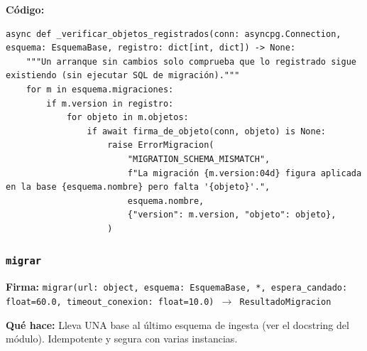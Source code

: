 \documentclass[11pt,a4paper]{article}
\begin{document}
\textbf{Código:}
\begin{lstlisting}
async def _verificar_objetos_registrados(conn: asyncpg.Connection, esquema: EsquemaBase, registro: dict[int, dict]) -> None:
    """Un arranque sin cambios solo comprueba que lo registrado sigue existiendo (sin ejecutar SQL de migración)."""
    for m in esquema.migraciones:
        if m.version in registro:
            for objeto in m.objetos:
                if await firma_de_objeto(conn, objeto) is None:
                    raise ErrorMigracion(
                        "MIGRATION_SCHEMA_MISMATCH",
                        f"La migración {m.version:04d} figura aplicada en la base {esquema.nombre} pero falta '{objeto}'.",
                        esquema.nombre,
                        {"version": m.version, "objeto": objeto},
                    )
\end{lstlisting}

\subsubsection*{\texttt{migrar}}
\textbf{Firma:} \texttt{migrar(url: object, esquema: EsquemaBase, *, espera\_candado: float=60.0, timeout\_conexion: float=10.0) $\rightarrow$ ResultadoMigracion}

\textbf{Qué hace:} Lleva UNA base al último esquema de ingesta (ver el docstring del módulo). Idempotente y segura con varias instancias.
\end{document}
